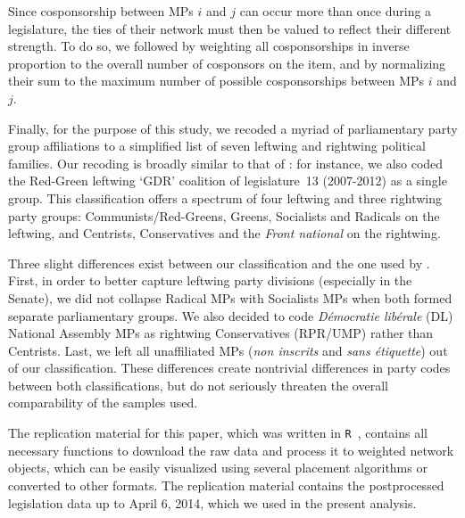 Since cosponsorship between MPs $i$ and $j$ can occur more than once during a legislature, the ties of their network must then be valued to reflect their different strength. To do so, we followed \citet[Equation.~1]{GrossShalizi2012} by weighting all cosponsorships in inverse proportion to the overall number of cosponsors on the item, and by normalizing their sum to the maximum number of possible cosponsorships between MPs $i$ and $j$.%

Finally, for the purpose of this study, we recoded a myriad of parliamentary party group affiliations to a simplified list of seven leftwing and rightwing political families. Our recoding is broadly similar to that of \citet[p.~310]{GodboutFoucault2013-FP}: for instance, we also coded the Red-Green leftwing `GDR' coalition of legislature~13 (2007-2012) as a single group. This classification offers a spectrum of four leftwing and three rightwing party groups: Communists/Red-Greens, Greens, Socialists and Radicals on the leftwing, and Centrists, Conservatives and the \emph{Front national} on the rightwing.%

Three slight differences exist between our classification and the one used by \citet[p.~310]{GodboutFoucault2013-FP}. First, in order to better capture leftwing party divisions (especially in the Senate), we did not collapse Radical MPs with Socialists MPs when both formed separate parliamentary groups. We also decided to code \emph{Démocratie libérale} (DL) National Assembly MPs as rightwing Conservatives (RPR/UMP) rather than Centrists. Last, we left all unaffiliated MPs (\emph{non inscrits} and \emph{sans étiquette}) out of our classification. These differences create nontrivial differences in party codes between both classifications, but do not seriously threaten the overall comparability of the samples used.%

The replication material for this paper, which was written in \texttt{R}~\citep{R}, contains all necessary functions to download the raw data and process it to weighted network objects, which can be easily visualized using several placement algorithms \citep{Butts2008-JSS} or converted to other formats. The replication material contains the postprocessed legislation data up to April 6, 2014, which we used in the present analysis. %
